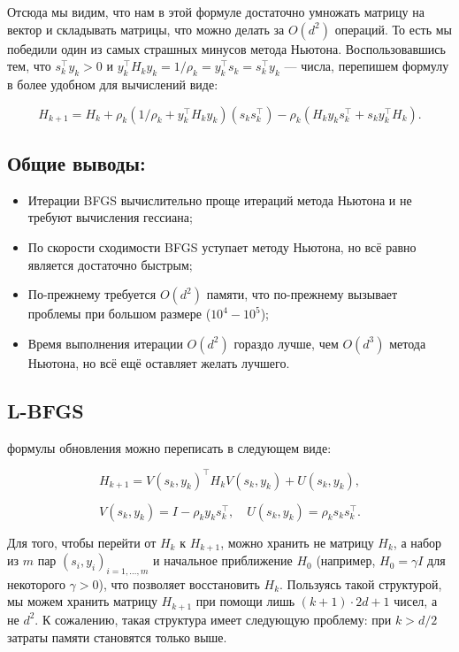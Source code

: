 Отсюда мы видим, что нам в этой формуле достаточно умножать матрицу на вектор и складывать матрицы, что можно делать за \(O(d^2)\) операций. То есть мы победили один из самых страшных минусов метода Ньютона. Воспользовавшись тем, что \(s_k^\top y_k > 0\) и \(y_k^\top H_k y_k = 1/\rho_k = y_k^\top s_k = s_k^\top y_k\) — числа,
перепишем формулу в более удобном для вычислений виде:

\[
    H_{k+1} = H_k + \rho_k \left( 1 / \rho_k + y_k^\top H_k y_k \right)
    \left( s_k s_k^\top \right) - \rho_k \left( H_k y_k s_k^\top + s_k y_k^\top H_k \right).
\]

\subsection*{Общие выводы:}

\begin{itemize}
    \item Итерации BFGS вычислительно проще итераций метода Ньютона и не требуют вычисления
          гессиана;
    \item По скорости сходимости BFGS уступает методу Ньютона, но всё равно является достаточно
          быстрым;
    \item По-прежнему требуется \(O(d^2)\) памяти, что по-прежнему вызывает проблемы при большом
          размере (\(10^4 - 10^5\));
    \item Время выполнения итерации \(O(d^2)\) гораздо лучше, чем \(O(d^3)\) метода Ньютона, но всё
          ещё оставляет желать лучшего.
\end{itemize}



\subsection*{L-BFGS}

формулы обновления можно переписать в следующем виде:

\[
    H_{k+1} = V(s_k, y_k)^\top H_k V(s_k, y_k) + U(s_k, y_k),
\]

\[
    V(s_k, y_k) = I - \rho_k y_k s_k^\top, \quad U(s_k, y_k) = \rho_k s_k s_k^\top.
\]

Для того, чтобы перейти от \(H_k\) к \(H_{k+1}\), можно хранить не матрицу \(H_k\), а набор из \(m\) пар
\((s_i, y_i)_{i=1, \dots, m}\) и начальное приближение \(H_0\) (например, \(H_0 = \gamma I\) для некоторого \(\gamma > 0\)),
что позволяет восстановить \(H_k\). Пользуясь такой структурой, мы можем хранить матрицу \(H_{k+1}\) при помощи лишь
\((k + 1) \cdot 2d + 1\) чисел, а не \(d^2\). К сожалению, такая структура имеет следующую проблему: при \(k > d/2\) затраты памяти становятся только выше.

